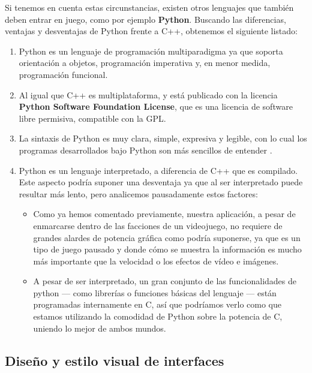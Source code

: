 Si tenemos en cuenta estas circunstancias, existen otros lenguajes que también deben entrar en juego,
como por ejemplo \textbf{Python}. Buscando las diferencias, ventajas y desventajas de Python frente a C++,
obtenemos el siguiente listado:

\begin{enumerate}
    \item Python es un lenguaje de programación multiparadigma ya que soporta orientación a objetos,
            programación imperativa y, en menor medida, programación funcional.
    \item Al igual que C++ es multiplataforma, y está publicado con la licencia \textbf{Python Software Foundation
            License}, que es una licencia de software libre permisiva, compatible con la GPL.
    \item La sintaxis de Python es muy clara, simple, expresiva y legible, con lo cual los programas
            desarrollados bajo Python son más sencillos de entender \cite{Pilgrim:2004:DP:983200}.
    \item Python es un lenguaje interpretado, a diferencia de C++ que es compilado. Este aspecto podría suponer una
            desventaja ya que al ser interpretado puede resultar más lento, pero analicemos pausadamente estos
            factores:
        \begin{itemize}
            \item Como ya hemos comentado previamente, nuestra aplicación, a pesar de enmarcarse dentro de las
                    facciones de un videojuego, no requiere de grandes alardes de potencia gráfica como podría
                    suponerse, ya que es un tipo de juego pausado y donde cómo se muestra la información
                    es mucho más importante que la velocidad o los efectos de vídeo e imágenes.
            \item A pesar de ser interpretado, un gran conjunto de las funcionalidades de python --- como librerías o
                    funciones básicas del lenguaje --- están programadas internamente en C, así que podríamos
                    verlo como que estamos utilizando la comodidad de Python sobre la potencia de C, uniendo
                    lo mejor de ambos mundos.
        \end{itemize}
\end{enumerate}

\subsection{Diseño y estilo visual de interfaces}

